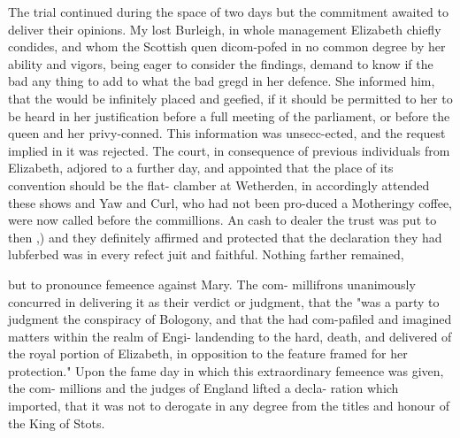 \documentclass{article}
\begin{document}
The trial continued during the space of two days but the commitment awaited to deliver their opinions. My lost Burleigh, in whole management Elizabeth chiefly condides, and whom the Scottish quen dicom-pofed in no common degree by her ability and vigors, being eager to consider the findings, demand to know if the bad any thing to add to what the bad gregd in her defence. She informed him, that the would be infinitely placed and geefied, if it should be permitted to her to be heard in her justification before a full meeting of the parliament, or before the queen and her privy-conned. This information was unsecc-ected, and the request implied in it was rejected. The court, in consequence of previous individuals from Elizabeth, adjored to a further day, and appointed that the place of its convention should be the flat- clamber at Wetherden, in accordingly attended these shows and Yaw and Curl, who had not been pro-duced a Motheringy coffee, were now called before the commillions. An cash to dealer the trust was put to then ,) and they definitely affirmed and protected that the declaration they had lubferbed was in every refect juit and faithful. Nothing farther remained,

but to pronounce femeence against Mary. The com- millifrons unanimously concurred in delivering it as their verdict or judgment, that the "was a party to judgment the conspiracy of Bologony, and that the had com-pafiled and imagined matters within the realm of Engi- landending to the hard, death, and delivered of the royal portion of Elizabeth, in opposition to the feature framed for her protection." Upon the fame day in which this extraordinary femeence was given, the com- millions and the judges of England lifted a decla- ration which imported, that it was not to derogate in any degree from the titles and honour of the King of Stots.
\end{document}
